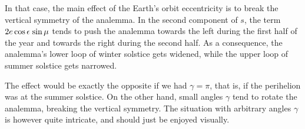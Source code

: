 \documentclass[12pt]{article}
\newcommand{\Sin}{%
  \mathop{\sbox0{$\cos$}\makebox[\wd0][r]{$\sin$}}%
}
\begin{document}
In that case, the main effect of the Earth's orbit eccentricity is to break 
the vertical symmetry of the analemma. 
In the second component of $s$, the term $2e\cos\epsilon\Sin\mu$
tends to push the analemma towards the left during the first half of the year
and towards the right during the second half. As a consequence, the analemma's
lower loop of winter solstice gets widened, while the upper loop of summer 
solstice gets narrowed.

The effect would be exactly the opposite if we had $\gamma=\pi$,
that is, if the perihelion was at the summer solstice. 
On the other hand, small angles $\gamma$ tend to rotate the analemma, 
breaking the vertical symmetry. The situation with arbitrary angles $\gamma$
is however quite intricate, and should just be enjoyed visually.

\end{document}
